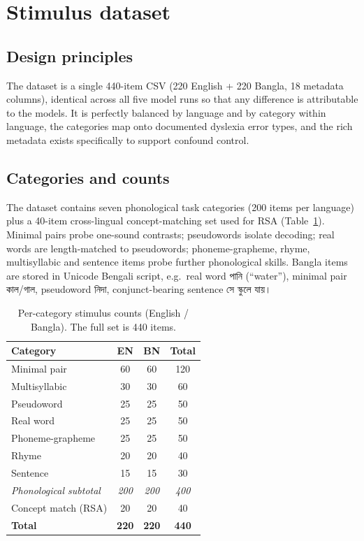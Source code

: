 \documentclass[preprint,12pt]{elsarticle}
\newcommand{\bn}[1]{{\banglafont #1}}
\begin{document}
\section{Stimulus dataset}
\label{sec:data}
\subsection{Design principles}
The dataset is a single 440-item CSV (220 English + 220 Bangla, 18 metadata columns), identical across all five model runs so that any difference is attributable to the models. It is perfectly balanced by language and by category within language, the categories map onto documented dyslexia error types, and the rich metadata exists specifically to support confound control.

\subsection{Categories and counts}
The dataset contains seven phonological task categories (200 items per language) plus a 40-item cross-lingual concept-matching set used for RSA (Table~\ref{tab:data}). Minimal pairs probe one-sound contrasts; pseudowords isolate decoding; real words are length-matched to pseudowords; phoneme-grapheme, rhyme, multisyllabic and sentence items probe further phonological skills. Bangla items are stored in Unicode Bengali script, e.g.\ real word \bn{পানি} (``water''), minimal pair \bn{কাল}/\bn{গাল}, pseudoword \bn{নিদা}, conjunct-bearing sentence \bn{সে স্কুলে যায়।}

\begin{table}[H]
\caption{Per-category stimulus counts (English / Bangla). The full set is 440 items.}
\label{tab:data}
\centering
\small
\begin{tabular}{lccc}
\toprule
\textbf{Category} & \textbf{EN} & \textbf{BN} & \textbf{Total} \\
\midrule
Minimal pair        & 60 & 60 & 120 \\
Multisyllabic       & 30 & 30 & 60 \\
Pseudoword          & 25 & 25 & 50 \\
Real word           & 25 & 25 & 50 \\
Phoneme-grapheme    & 25 & 25 & 50 \\
Rhyme               & 20 & 20 & 40 \\
Sentence            & 15 & 15 & 30 \\
\textit{Phonological subtotal} & \textit{200} & \textit{200} & \textit{400} \\
Concept match (RSA) & 20 & 20 & 40 \\
\midrule
\textbf{Total}      & \textbf{220} & \textbf{220} & \textbf{440} \\
\bottomrule
\end{tabular}
\end{table}
\end{document}
